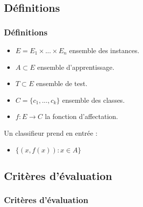  \subsection{Définitions}
  \begin{frame}
   \frametitle{Définitions}
  \begin{itemize}
   \item $E = E_1 \times ... \times E_n$ ensemble des instances.
   \item $A \subset E$ ensemble d'apprentissage.
   \item $T \subset E$ ensemble de test.
   \item $C = \{c_1, ..., c_k\}$ ensemble des classes.
   \item $f : E \longrightarrow C$ la fonction d'affectation.\\
  \end{itemize}

Un classifieur prend en entrée : 
\begin{itemize}
 \item $\{(x, f(x)) : x \in A\}$
 
\end{itemize}

  

  \end{frame}


  \subsection{Critères d'évaluation}
  \begin{frame}
   \frametitle{Critères d'évaluation}

  \end{frame}
